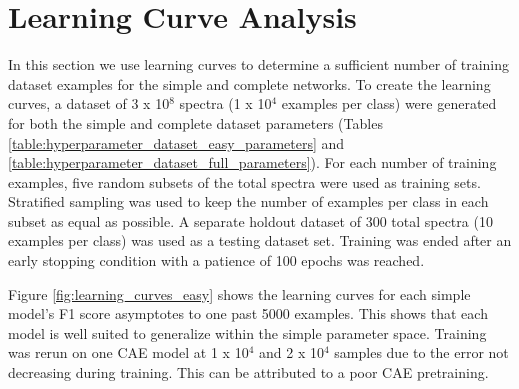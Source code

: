 

\section{Learning Curve Analysis}

In this section we use learning curves to determine a sufficient number of training dataset examples for the simple and complete networks. To create the learning curves, a dataset of 3 x 10$^{8}$ spectra (1 x 10$^{4}$ examples per class) were generated for both the simple and complete dataset parameters (Tables \ref{table:hyperparameter_dataset_easy_parameters} and \ref{table:hyperparameter_dataset_full_parameters}). For each number of training examples, five random subsets of the total spectra were used as training sets. Stratified sampling was used to keep the number of examples per class in each subset as equal as possible. A separate holdout dataset of 300 total spectra (10 examples per class) was used as a testing dataset set. Training was ended after an early stopping condition with a patience of 100 epochs was reached.

Figure \ref{fig:learning_curves_easy} shows the learning curves for each simple model's F1 score asymptotes to one past 5000 examples. This shows that each model is well suited to generalize within the simple parameter space. Training was rerun on one CAE model at 1 x 10$^{4}$ and 2 x 10$^{4}$ samples due to the error not decreasing during training. This can be attributed to a poor CAE pretraining.


